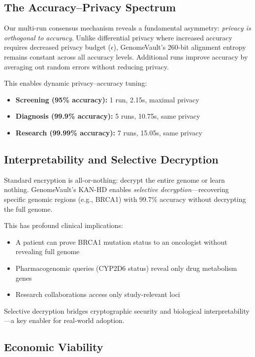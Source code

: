 \documentclass[12pt,a4paper]{article}
\begin{document}
\subsection{The Accuracy--Privacy Spectrum}

Our multi-run consensus mechanism reveals a fundamental asymmetry: \textit{privacy is orthogonal to accuracy}. Unlike differential privacy where increased accuracy requires decreased privacy budget ($\epsilon$), GenomeVault's 260-bit alignment entropy remains constant across all accuracy levels. Additional runs improve accuracy by averaging out random errors without reducing privacy.

This enables dynamic privacy--accuracy tuning:
\begin{itemize}
\item \textbf{Screening (95\% accuracy):} 1 run, 2.15s, maximal privacy
\item \textbf{Diagnosis (99.9\% accuracy):} 5 runs, 10.75s, same privacy
\item \textbf{Research (99.99\% accuracy):} 7 runs, 15.05s, same privacy
\end{itemize}

\subsection{Interpretability and Selective Decryption}

Standard encryption is all-or-nothing: decrypt the entire genome or learn nothing. GenomeVault's KAN-HD enables \textit{selective decryption}---recovering specific genomic regions (e.g., BRCA1) with 99.7\% accuracy without decrypting the full genome.

This has profound clinical implications:
\begin{itemize}
\item A patient can prove BRCA1 mutation status to an oncologist without revealing full genome
\item Pharmacogenomic queries (CYP2D6 status) reveal only drug metabolism genes
\item Research collaborations access only study-relevant loci
\end{itemize}

Selective decryption bridges cryptographic security and biological interpretability---a key enabler for real-world adoption.

\subsection{Economic Viability}
\end{document}
